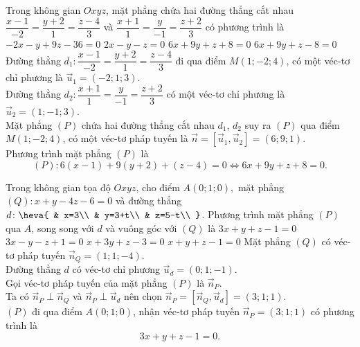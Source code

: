 \begin{ex}%
	Trong không gian $ Oxyz$, mặt phẳng chứa hai đường thẳng cắt nhau\break $\dfrac{x-1}{-2}=\dfrac{y+2}{1}=\dfrac{z-4}{3}$ và $\dfrac{x+1}{1}=\dfrac{y}{-1}=\dfrac{z+2}{3}$ có phương trình là
	\choice
	{$-2x-y+9z-36=0$}
	{$ 2x-y-z=0$}
	{\True $ 6x+9y+z+8=0$}
	{$ 6x+9y+z-8=0$}
	\loigiai
	{
		Đường thẳng $d_1\colon\dfrac{x-1}{-2}=\dfrac{y+2}{1}=\dfrac{z-4}{3}$ đi qua điểm $ M(1;-2;4)$, có một véc-tơ chỉ phương là $\overrightarrow{u}_1=(-2;1;3)$.\\
		Đường thẳng $d_2\colon\dfrac{x+1}{1}=\dfrac{y}{-1}=\dfrac{z+2}{3}$ có một véc-tơ chỉ phương là $\overrightarrow{u}_2=(1;-1;3)$.\\
		Mặt phẳng $(P)$ chứa hai đường thẳng cắt nhau $d_1$, $d_2$ suy ra $(P)$ qua điểm $ M(1;-2;4)$, có một véc-tơ pháp tuyến là $\overrightarrow{n}=\left[\overrightarrow{u}_1,\overrightarrow{u}_2\right]=(6;9;1)$.\\ Phương trình mặt phẳng $(P)$ là 
		$$(P)\colon 6(x-1)+9(y+2)+(z-4)=0\Leftrightarrow 6x+9y+z+8=0.$$}
\end{ex}

\begin{ex}%
	Trong không gian tọa độ $ Oxyz$, cho điểm $ A(0;1;0),$ mặt phẳng \break $(Q)\colon x+y-4z-6=0$ và đường thẳng $ d\colon\heva{
		& x=3\\ 
		& y=3+t\\ 
		& z=5-t\\ 
	}$. Phương trình mặt phẳng $(P)$ qua $ A$, song song với $ d$ và vuông góc với $(Q)$ là 
	\choice
	{\True $ 3x+y+z-1=0$}
	{$ 3x-y-z+1=0$}
	{$ x+3y+z-3=0$}
	{$ x+y+z-1=0$}
	\loigiai
	{
		Mặt phẳng $(Q)$ có véc-tơ pháp tuyến $\overrightarrow{n}_Q=(1;1;-4)$.\\
		Đường thẳng $ d$ có véc-tơ chỉ phương $\overrightarrow{u}_d=(0;1;-1)$.\\
		Gọi véc-tơ pháp tuyến của mặt phẳng $(P)$ là $\overrightarrow{n}_P$.\\
		Ta có $\overrightarrow{n}_P\perp\overrightarrow{n}_Q$ và $\overrightarrow{n}_P\perp\overrightarrow{u}_d$ nên chọn $\overrightarrow{n}_P=\left[\overrightarrow{n}_Q,\overrightarrow{u}_d\right]=(3;1;1)$.\\
		$(P)$ đi qua điểm $ A(0;1;0)$, nhận véc-tơ pháp tuyến $\overrightarrow{n}_P=(3;1;1)$ có phương trình là $$ 3x+y+z-1=0.$$}
\end{ex}

